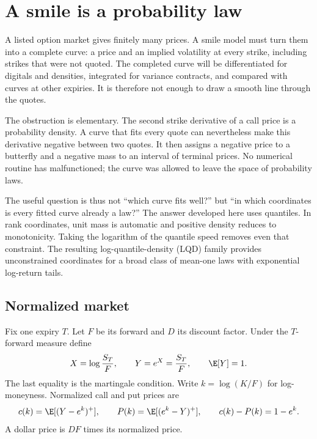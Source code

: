 \section{A smile is a probability law}
\label{sec:intro}

A listed option market gives finitely many prices.  A smile model must turn
them into a complete curve: a price and an implied volatility at every strike,
including strikes that were not quoted.  The completed curve will be
differentiated for digitals and densities, integrated for variance contracts,
and compared with curves at other expiries.  It is therefore not enough to
draw a smooth line through the quotes.

The obstruction is elementary.  The second strike derivative of a call price
is a probability density.  A curve that fits every quote can nevertheless
make this derivative negative between two quotes.  It then assigns a negative
price to a butterfly and a negative mass to an interval of terminal prices.
No numerical routine has malfunctioned; the curve was allowed to leave the
space of probability laws.

The useful question is thus not ``which curve fits well?'' but ``in which
coordinates is every fitted curve already a law?''  The answer developed here
uses quantiles.  In rank coordinates, unit mass is automatic and positive
density reduces to monotonicity.  Taking the logarithm of the quantile speed
removes even that constraint.  The resulting log-quantile-density (LQD)
family provides unconstrained coordinates for a broad class of mean-one laws
with exponential log-return tails.

\subsection{Normalized market}

Fix one expiry $T$.  Let $F$ be its forward and $D$ its discount factor.  Under
the $T$-forward measure define
\begin{equation}
X=\log\frac{S_T}{F},\qquad Y=e^X=\frac{S_T}{F},\qquad \E[Y]=1.
\label{eq:Xdef}
\end{equation}
The last equality is the martingale condition.  Write
$k=\log(K/F)$ for log-moneyness.  Normalized call and put prices are
\begin{equation}
c(k)=\E[(Y-e^k)^+],\qquad P(k)=\E[(e^k-Y)^+],
\qquad c(k)-P(k)=1-e^k.
\label{eq:calldef}
\end{equation}
A dollar price is $DF$ times its normalized price.


